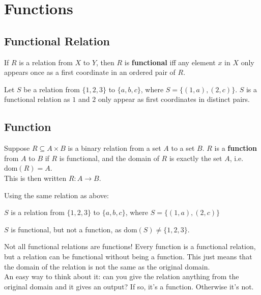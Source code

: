 \documentclass[../notes.tex]{subfiles}
\begin{document}
		\section{Functions}
			\subsection{Functional Relation}
				If $R$ is a relation from $X$ to $Y$, then $R$ is \textbf{functional} iff any element $x$ in $X$ only appears once as a first coordinate in an ordered pair of $R$.
				\begin{example}
					Let $S$ be a relation from $\{1, 2, 3\}$ to $\{a, b, c\}$, where $S = \bigl\{(1, a), (2, c)\bigr\}$. $S$ is a functional relation as $1$ and $2$ only appear as first coordinates in distinct pairs.
				\end{example}
			\subsection{Function}
				Suppose $R \subseteq A \times B$ is a binary relation from a set $A$ to a set $B$. $R$ is a \textbf{function} from $A$ to $B$ if $R$ is functional, and the domain of $R$ is exactly the set $A$, i.e. $\mathrm{dom}(R) = A$.\\
				This is then written $R: A \rightarrow B$.
				\begin{example}
					Using the same relation as above:
						\begin{indentparagraph}
							$S$ is a relation from $\{1, 2, 3\}$ to $\{a, b, c\}$, where $S = \bigl\{(1, a), (2, c)\bigr\}$
						\end{indentparagraph}
						$S$ is functional, but not a function, as $\mathrm{dom}(S) \neq \{1, 2, 3\}$.
				\end{example}
				\begin{sidenote}{Not all functional relations are functions!}
					Every function is a functional relation, but a relation can be functional without being a function. This just means that the domain of the relation is not the same as the original domain.\\
					An easy way to think about it: can you give the relation anything from the original domain and it gives an output? If so, it's a function. Otherwise it's not.
				\end{sidenote}
\end{document}
